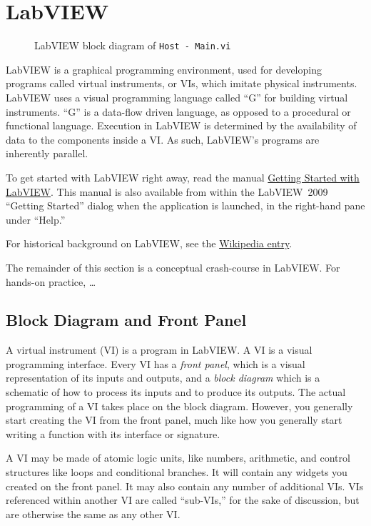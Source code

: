 
\section{LabVIEW}
\label{sec:eq_labview}

\begin{figure}[htbp]
  \centering
  \caption{LabVIEW block diagram of \texttt{Host - Main.vi}}
  \label{fig:eq_labview:hostmainvi}
\end{figure}

LabVIEW is a graphical programming environment, used for developing programs called virtual instruments, or VIs, which imitate physical instruments.  LabVIEW uses a visual programming language called ``G'' for building virtual instruments.  ``G'' is a data-flow driven language, as opposed to a procedural or functional language.  Execution in LabVIEW is determined by the availability of data to the components inside a VI.  As such, LabVIEW's programs are inherently parallel.  

To get started with LabVIEW right away, read the manual \href{Manuals/LV_Getting_Started}{Getting Started with LabVIEW}.  This manual is also available from within the LabVIEW~2009 ``Getting Started'' dialog when the application is launched, in the right-hand pane under ``Help.''

For historical background on LabVIEW, see the \href{http://en.wikipedia.org/wiki/LabVIEW}{Wikipedia entry}.

The remainder of this section is a conceptual crash-course in LabVIEW.  For hands-on practice, \ldots \FIXME

\subsection{Block Diagram and Front Panel}
\label{sec:eq_labview:block_diagram}

A virtual instrument (VI) is a program in LabVIEW.  A VI is a visual programming interface.  Every VI has a \textit{front panel}, which is a visual representation of its inputs and outputs, and a \textit{block diagram} which is a schematic of how to process its inputs and to produce its outputs.  The actual programming of a VI takes place on the block diagram.  However, you generally start creating the VI from the front panel, much like how you generally start writing a function with its interface or signature.

A VI may be made of atomic logic units, like numbers, arithmetic, and control structures like loops and conditional branches.  It will contain any widgets you created on the front panel.  It may also contain any number of additional VIs.  VIs referenced within another VI are called ``sub-VIs,'' for the sake of discussion, but are otherwise the same as any other VI.

